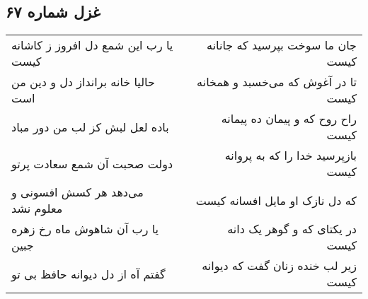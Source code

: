 \begin{center}
\section*{غزل شماره ۶۷}
\label{sec:sh067}
\begin{longtable}{l p{0.5cm} r}
یا رب این شمع دل افروز ز کاشانه کیست
&&
جان ما سوخت بپرسید که جانانه کیست
\\
حالیا خانه برانداز دل و دین من است
&&
تا در آغوش که می‌خسبد و همخانه کیست
\\
باده لعل لبش کز لب من دور مباد
&&
راح روح که و پیمان ده پیمانه کیست
\\
دولت صحبت آن شمع سعادت پرتو
&&
بازپرسید خدا را که به پروانه کیست
\\
می‌دهد هر کسش افسونی و معلوم نشد
&&
که دل نازک او مایل افسانه کیست
\\
یا رب آن شاهوش ماه رخ زهره جبین
&&
در یکتای که و گوهر یک دانه کیست
\\
گفتم آه از دل دیوانه حافظ بی تو
&&
زیر لب خنده زنان گفت که دیوانه کیست
\\
\end{longtable}
\end{center}

